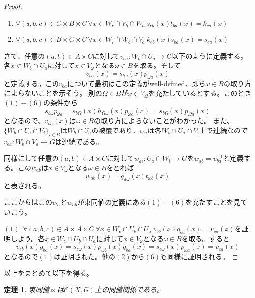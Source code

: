 \documentclass[leqno]{jsarticle}
\newtheorem{thm}{定理}
\begin{document}
\begin{proof}
\begin{enumerate}
\item $\forall (a,b,c)\in C\times B\times C\ \forall x\in  W_c\cap V_b\cap W_a\ s_{cb}(x)t_{ba}(x)=k_{ca}(x) $
\item $\forall (a,b,c)\in B\times C\times C\ \forall x\in  W_c\cap W_b\cap V_a\ k_{cb}(x)s_{ba}(x)=s_{ca}(x) $
\end{enumerate}
さて、任意の$(a,b)\in A\times C$に対して$v_{ba}:W_b\cap U_a\to G$以下のように定義する。
各$x\in W_b\cap U_a$に対して$x\in V_{\omega}$となる$\omega\in B$を取る。そして
\[
v_{ba}(x)=s_{b\omega}(x)p_{\omega a}(x)
\]
と定義する。この$v_{ba}$について最初はこの定義がwell-defined、即ち$\omega\in B$の取り方によらないことを示そう。
別の$\Omega\in B$が$x\in V_{\Omega}$を充たしているとする。このとき$(1)-(6)$の条件から
\[
s_{b\omega}p_{\omega a}=s_{b\Omega}(x)h_{\Omega \omega}(x)p_{\omega a}(x)=s_{b\Omega}(x)p_{\Omega a}(x)
\]
となるので、$v_{ba}(x)$は$\omega\in B$の取り方によらないことがわかった。
また、$\{W_b\cap U_a\cap V_{i}\}_{i\in B}$は$W_b\cap U_a$の被覆であり、$v_{ba}$は各$W_b\cap U_a\cap V_{i}$上で連続なので$v_{ba}:W_b\cap V_a\to G$は連続である。
\par
同様にして任意の$(a,b)\in A\times C$に対して$w_{ab}:U_a\cap W_b\to G$を$w_{ab}=v_{ba}^{-1}$と定義する。この$w_{ab}$は$x\in V_{\omega}$となる$\omega\in B$をとれば
\[
w_{ab}(x)=q_{a\omega}(x)t_{\omega b}(x)
\]
と表される。
\par
ここからはこの$v_{ba}$と$w_{ab}$が束同値の定義にある$(1)-(6)$を充たすことを見ていこう。
\par
$(1)$\ $\forall (a,b,c)\in A\times A\times C\ \forall x\in  W_c\cap U_b\cap U_a\ v_{cb}(x)g_{ba}(x)=v_{ca}(x)$を証明しよう。各$x\in  W_c\cap U_b\cap U_a$に対して$x\in V_{\omega}$となる$\omega\in B$を取る。すると
\[
v_{cb}(x)g_{ba}(x)=s_{c\omega }(x)p_{\omega b}(x)g_{ba}(x)=s_{c\omega}(x)p_{\omega a}(x)=v_{ca}(x)
\]
となるので$(1)$は証明された。他の$(2)$から$(6)$も同様に証明される。
\end{proof}



以上をまとめて以下を得る。
\begin{thm}
束同値$\bowtie$は$\mathscr{C}(X,G)$上の同値関係である。
\end{thm}
\end{document}
